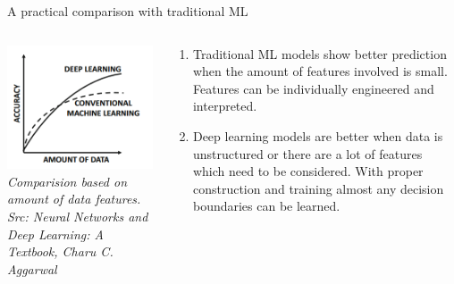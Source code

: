 \begin{frame}{A practical comparison with traditional ML}
	\begin{columns}[T]
	\begin{column}{0.4\textwidth}
	  \includegraphics[width=\textwidth]{images/trad vs deep.png}
	  \tiny{\textit{Comparision based on amount of data features.\\ Src: Neural Networks and Deep Learning: A Textbook, Charu C. Aggarwal}}
	\end{column}
	\begin{column}{0.6\textwidth}
	\begin{enumerate}[$\bullet$]
	\item Traditional ML models show better prediction when the amount of features involved is small. Features can be individually engineered and interpreted.\pause
	\item Deep learning models are better when data is unstructured or there are a lot of features which need to be considered. With proper construction and training almost any decision boundaries can be learned.
	\end{enumerate}
	\end{column}
  \end{columns}
\end{frame}


